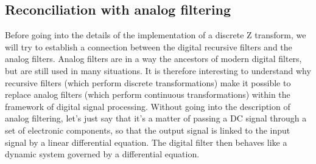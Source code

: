 \subsection{Reconciliation with analog filtering}
 
 
  Before going into the details of the implementation of a discrete Z transform, we will try to establish a connection between the digital recursive filters and the analog filters. Analog filters are in a way the ancestors of modern digital filters, but are still used in many situations. It is therefore interesting to understand why recursive filters (which perform discrete transformations) make it possible to replace analog filters (which perform continuous transformations) within the  framework of digital signal processing. Without going into the description of analog filtering, let's just say that it's a matter of passing a DC signal through a set of electronic components, so that the output signal is linked to the input signal by a linear differential equation. The digital filter then behaves like a dynamic system governed by a differential equation.
 
